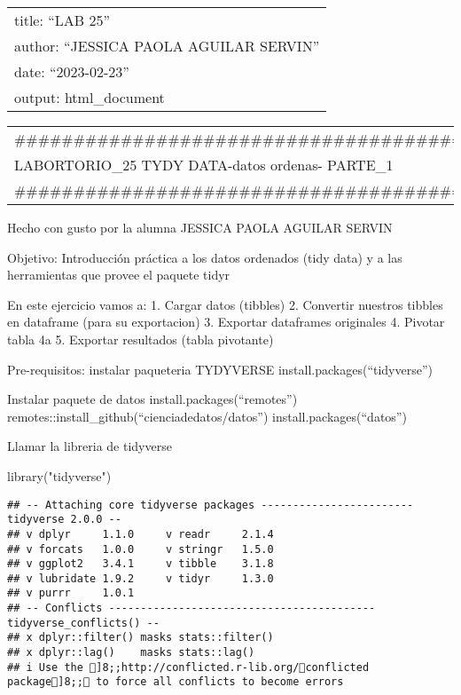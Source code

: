 \documentclass[
]{article}
\author{}
\date{\vspace{-2.5em}}
\newenvironment{Shaded}{\begin{snugshade}}{\end{snugshade}}
\newcommand{\FunctionTok}[1]{\textcolor[rgb]{0.00,0.00,0.00}{#1}}
\newcommand{\NormalTok}[1]{#1}
\newcommand{\StringTok}[1]{\textcolor[rgb]{0.31,0.60,0.02}{#1}}
\begin{document}
\begin{longtable}[]{@{}l@{}}
\toprule()
\endhead
title: ``LAB 25'' \\
author: ``JESSICA PAOLA AGUILAR SERVIN'' \\
date: ``2023-02-23'' \\
output: html\_document \\
\bottomrule()
\end{longtable}

\begin{longtable}[]{@{}l@{}}
\toprule()
\endhead
\#\#\#\#\#\#\#\#\#\#\#\#\#\#\#\#\#\#\#\#\#\#\#\#\#\#\#\#\#\#\#\#\#\#\#\#\#\#\#\#\#\#\#\#\#\# \\
LABORTORIO\_25 TYDY DATA-datos ordenas- PARTE\_1 \\
\#\#\#\#\#\#\#\#\#\#\#\#\#\#\#\#\#\#\#\#\#\#\#\#\#\#\#\#\#\#\#\#\#\#\#\#\#\#\#\#\#\#\#\#\#\# \\
\bottomrule()
\end{longtable}

Hecho con gusto por la alumna JESSICA PAOLA AGUILAR SERVIN

Objetivo: Introducción práctica a los datos ordenados (tidy data) y a
las herramientas que provee el paquete tidyr

En este ejercicio vamos a: 1. Cargar datos (tibbles) 2. Convertir
nuestros tibbles en dataframe (para su exportacion) 3. Exportar
dataframes originales 4. Pivotar tabla 4a 5. Exportar resultados (tabla
pivotante)

Pre-requisitos: instalar paqueteria TYDYVERSE
install.packages(``tidyverse'')

Instalar paquete de datos install.packages(``remotes'')
remotes::install\_github(``cienciadedatos/datos'')
install.packages(``datos'')

Llamar la libreria de tidyverse

\begin{Shaded}
\begin{Highlighting}[]
\FunctionTok{library}\NormalTok{(}\StringTok{"tidyverse"}\NormalTok{)}
\end{Highlighting}
\end{Shaded}

\begin{verbatim}
## -- Attaching core tidyverse packages ------------------------ tidyverse 2.0.0 --
## v dplyr     1.1.0     v readr     2.1.4
## v forcats   1.0.0     v stringr   1.5.0
## v ggplot2   3.4.1     v tibble    3.1.8
## v lubridate 1.9.2     v tidyr     1.3.0
## v purrr     1.0.1     
## -- Conflicts ------------------------------------------ tidyverse_conflicts() --
## x dplyr::filter() masks stats::filter()
## x dplyr::lag()    masks stats::lag()
## i Use the ]8;;http://conflicted.r-lib.org/conflicted package]8;; to force all conflicts to become errors
\end{verbatim}
\end{document}
